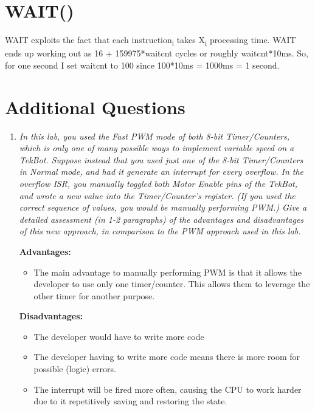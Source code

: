 \documentclass[12pt,letterpaper]{article}
\begin{document}
	
\section{WAIT()}
	WAIT exploits the fact that each instruction\textsubscript{i} takes X\textsubscript{i} processing time.
	WAIT ends up working out as 16 + 159975*waitcnt cycles or roughly waitcnt*10ms.
	So, for one second I set waitcnt to 100 since 100*10ms = 1000ms = 1 second.

\section{Additional Questions}
	\begin{enumerate}
	  \item
	  \textit{In this lab, you used the Fast PWM mode of both 8-bit Timer/Counters, which is only one of many possible ways to implement variable speed on a TekBot. 
	  Suppose instead that you used just one of the 8-bit Timer/Counters in Normal mode, and had it generate an interrupt for every overflow. 
	  In the overflow ISR, you manually toggled both Motor Enable pins of the TekBot, and wrote a new value into the Timer/Counter’s register. 
	  (If you used the correct sequence of values, you would be manually performing PWM.) 
	  Give a detailed assessment (in 1-2 paragraphs) of the advantages and disadvantages of this new approach, in comparison to the PWM approach used in this lab.}
	  
	  \textbf{Advantages:}
	  \begin{itemize}
	  	\item 
	  	The main advantage to manually performing PWM is that it allows the developer to use only one timer/counter.
	  	This allows them to leverage the other timer for another purpose.
	  	
	  \end{itemize}
	  
	  \textbf{Disadvantages:}
	  \begin{itemize}
	  	\item
	  	The developer would have to write more code
	  	
	  	\item
	  	The developer having to write more code means there is more room for possible (logic) errors.
	  	
	  	\item
	  	The interrupt will be fired more often, causing the CPU to work harder due to it repetitively saving and restoring the state.
	  	

\end{itemize}
\end{enumerate}
\end{document}
